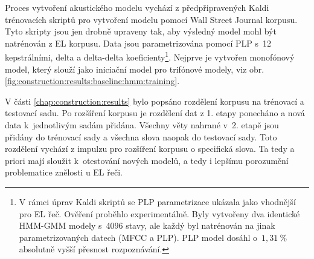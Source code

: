 
Proces vytvoření akustického modelu vychází z předpřipravených Kaldi trénovacích skriptů pro vytvoření modelu pomocí Wall Street Journal korpusu.
Tyto skripty jsou jen drobně upraveny tak, aby výsledný model mohl být natrénován z EL korpusu. Data jsou parametrizována pomocí PLP s~12 kepstrálními, delta a delta-delta koeficienty\footnote{V rámci úprav Kaldi skriptů se PLP parametrizace ukázala jako vhodnější pro EL řeč. Ověření proběhlo experimentálně. Byly vytvořeny dva identické HMM-GMM modely s~4096 stavy, ale každý byl natrénován na jinak parametrizovaných datech (MFCC a PLP). PLP model dosáhl o~$1,31~\%$ absolutně vyšší přesnost rozpoznávání.}. Nejprve je vytvořen monofónový model, který slouží jako iniciační model pro trifónové  modely, viz obr. \ref{fig:construction:results:baseline:hmm:training}.


V části \ref{chap:construction:results} bylo popsáno rozdělení korpusu na trénovací a testovací sadu.
Po rozšíření korpusu je rozdělení dat z 1. etapy ponecháno a nová data  k~jednotlivým sadám přidána.
Všechny věty nahrané v~2. etapě jsou přidány do trénovací sady a všechna slova naopak do testovací sady.
Toto rozdělení vychází z impulzu pro rozšíření korpusu o specifická slova.
Ta tedy a priori mají sloužit  k~otestování nových modelů, a tedy i lepšímu porozumění problematice znělosti u EL řeči.


